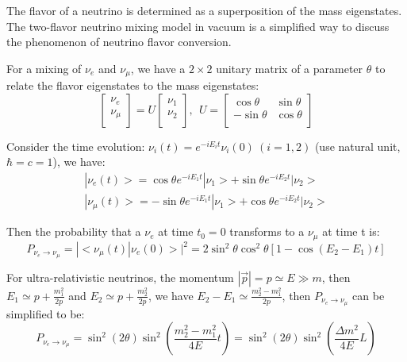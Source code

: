 \documentclass[preprint,12pt]{elsarticle}
\numberwithin{equation}{section}
\begin{document}
The flavor of a neutrino is determined as a superposition of the mass eigenstates. The two-flavor neutrino mixing model in vacuum is a simplified way to discuss the phenomenon of neutrino flavor conversion.

For a mixing of $\nu_e$ and $\nu_\mu$, we have a $2\times2$ unitary matrix of a parameter $\theta$ to relate the flavor eigenstates to the mass eigenstates\cite{cahn}:
\begin{equation}\label{eq:2flavormatrix}
\begin{bmatrix}
\nu_e\\
\nu_\mu\\
\end{bmatrix}
= U\begin{bmatrix}
\nu_1\\
\nu_2\\
\end{bmatrix}, ~~U=\begin{bmatrix}
\cos\theta &\sin\theta\\
-\sin\theta &\cos\theta\\
\end{bmatrix}
\end{equation}

Consider the time evolution: $\nu_i(t) = e^{-iE_it}\nu_i(0)~(i = 1,2)$ (use natural unit, $\hbar=c=1$), we have:
\begin{equation}
\begin{aligned}
|\nu_e(t)> = \cos\theta e^{-iE_1t}|\nu_1>+\sin\theta e^{-iE_2t}|\nu_2>
\\
|\nu_\mu(t)> = -\sin\theta e^{-iE_1t}|\nu_1>+\cos\theta e^{-iE_2t}|\nu_2>
\end{aligned}
\end{equation}

Then the probability that a $\nu_e$ at time $t_0=0$ transforms to a $\nu_\mu$ at time t is:
\begin{equation}
P_{\nu_e\to\nu_\mu} = |<\nu_\mu(t)|\nu_e(0)>|^2= 2\sin^2\theta\cos^2\theta[1-\cos(E_2-E_1)t]
\end{equation}

For ultra-relativistic neutrinos, the momentum $|\vec{p}|=p\simeq E\gg m$, then $E_1\simeq p+\frac{m^2_1}{2p}$ and $E_2\simeq p+\frac{m^2_2}{2p}$, we have $E_2-E_1\simeq\frac{m_2^2-m_1^2}{2p}$,
then $P_{\nu_e\to\nu_\mu}$ can be simplified to be:
\begin{equation}\label{eq:oscillation}
P_{\nu_e\to\nu_\mu} = \sin^2( 2\theta)\sin^2(\frac{m_2^2-m_1^2}{4E}t)=\sin^2( 2\theta)\sin^2(\frac{\Delta m^2}{4E}L)
\end{equation}
\end{document}
